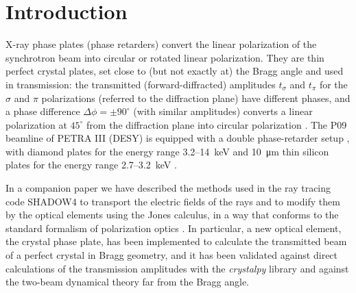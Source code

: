 \documentclass{iucr}
\begin{document}
\section{Introduction}
\label{sec:introduction}

X-ray phase plates (phase retarders) convert the linear polarization of the synchrotron beam into circular or rotated linear polarization. They are thin perfect crystal plates, set close to (but not exactly at) the Bragg angle and used in transmission: the transmitted (forward-diffracted) amplitudes $t_\sigma$ and $t_\pi$ for the $\sigma$ and $\pi$ polarizations (referred to the diffraction plane) have different phases, and a phase difference $\Delta\phi=\pm90^\circ$ (with similar amplitudes) converts a linear polarization at $45^\circ$ from the diffraction plane into circular polarization \cite{hirano1993nim,Detlefs2012,PolarizationDraft}. The P09 beamline of PETRA III (DESY) \cite{Strempfer2013} is equipped with a double phase-retarder setup \cite{Francoual2013}, with diamond plates for the energy range 3.2--14~keV and \SI{10}{\micro\meter} thin silicon plates for the energy range 2.7--3.2~keV \cite{Strempfer2013}.

In a companion paper \cite{SanchezdelRio2026efields} we have described the methods used in the ray tracing code SHADOW4 \cite{SHADOW4} to transport the electric fields of the rays and to modify them by the optical elements using the Jones calculus, in a way that conforms to the standard formalism of polarization optics \cite{PolarizationDraft}. In particular, a new optical element, the crystal phase plate, has been implemented to calculate the transmitted beam of a perfect crystal in Bragg geometry, and it has been validated against direct calculations of the transmission amplitudes with the {\it crystalpy} library \cite{Guigay2024} and against the two-beam dynamical theory far from the Bragg angle.
\end{document}
